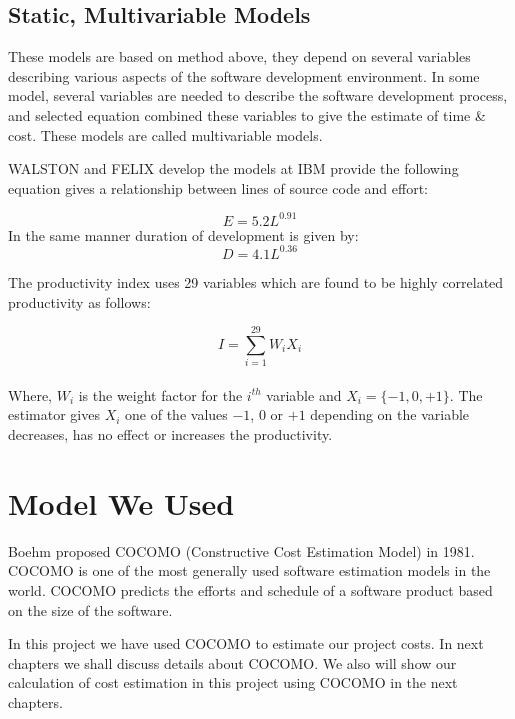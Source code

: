 \subsection{Static, Multivariable Models}
These models are based on method above, they depend on several variables describing various aspects of the software development environment. In some model, several variables are needed to describe the software development process, and selected equation combined these variables to give the estimate of time \& cost. These models are called multivariable models.

WALSTON and FELIX develop the models at IBM provide the following equation gives a relationship between lines of source code and effort:

$$E = 5.2L^{0.91}$$
In the same manner duration of development is given by:
$$D = 4.1L^{0.36}$$

The productivity index uses 29 variables which are found to be highly correlated productivity as follows:

$$I = \sum_{i=1}^{29} W_iX_i$$
\\
Where, $W_i$ is the weight factor for the $i^{th}$ variable and $X_i = \{-1,0,+1\}$. The estimator gives $X_i$ one of the values $-1$, $0$ or $+1$ depending on the variable decreases, has no effect or increases the productivity.

\section{Model We Used}
Boehm proposed COCOMO (Constructive Cost Estimation Model) in 1981. COCOMO is one of the most generally used software estimation models in the world. COCOMO predicts the efforts and schedule of a software product based on the size of the software.

In this project we have used COCOMO to estimate our project costs.
In next chapters we shall discuss details about COCOMO. We also will show our calculation of cost estimation in this project using COCOMO in the next chapters.
